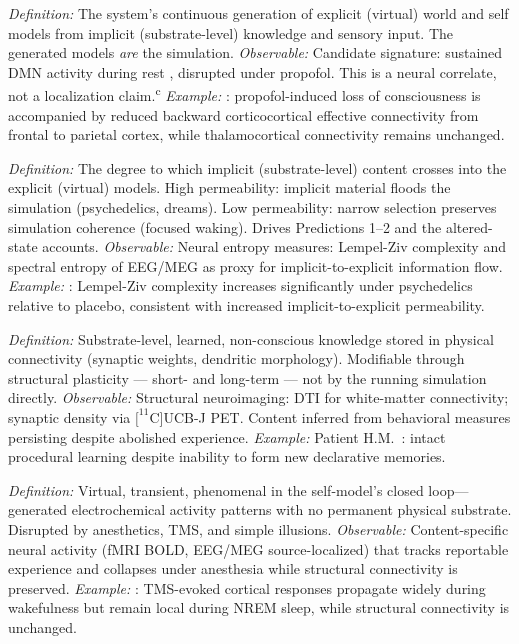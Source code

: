 \documentclass[12pt]{article}
\begin{document}
\begin{description}[leftmargin=0pt,labelindent=0pt,itemsep=0.8em]
\item[\textsc{Self-simulation}] \emph{Definition:} The system's continuous generation of explicit (virtual) world and self models from implicit (substrate-level) knowledge and sensory input. The generated models \emph{are} the simulation. \emph{Observable:} Candidate signature: sustained DMN activity during rest \citep{Raichle2001}, disrupted under propofol. This is a neural correlate, not a localization claim.\textsuperscript{c} \emph{Example:} \citet{Boly2012}: propofol-induced loss of consciousness is accompanied by reduced backward corticocortical effective connectivity from frontal to parietal cortex, while thalamocortical connectivity remains unchanged.

\item[\textsc{Permeability}] \emph{Definition:} The degree to which implicit (substrate-level) content crosses into the explicit (virtual) models. High permeability: implicit material floods the simulation (psychedelics, dreams). Low permeability: narrow selection preserves simulation coherence (focused waking). Drives Predictions 1--2 and the altered-state accounts. \emph{Observable:} Neural entropy measures: Lempel-Ziv complexity and spectral entropy of EEG/MEG as proxy for implicit-to-explicit information flow. \emph{Example:} \citet{Schartner2017}: Lempel-Ziv complexity increases significantly under psychedelics relative to placebo, consistent with increased implicit-to-explicit permeability.

\item[\textsc{Implicit model} (IWM/ISM)] \emph{Definition:} Substrate-level, learned, non-conscious knowledge stored in physical connectivity (synaptic weights, dendritic morphology). Modifiable through structural plasticity — short- and long-term — not by the running simulation directly. \emph{Observable:} Structural neuroimaging: DTI for white-matter connectivity; synaptic density via $[^{11}$C]UCB-J PET. Content inferred from behavioral measures persisting despite abolished experience. \emph{Example:} Patient H.M.\ \citep{ScovilleMilner1957,Milner1962}: intact procedural learning despite inability to form new declarative memories.

\item[\textsc{Explicit model} (EWM/ESM)] \emph{Definition:} Virtual, transient, phenomenal in the self-model's closed loop---generated electrochemical activity patterns with no permanent physical substrate. Disrupted by anesthetics, TMS, and simple illusions. \emph{Observable:} Content-specific neural activity (fMRI BOLD, EEG/MEG source-localized) that tracks reportable experience and collapses under anesthesia while structural connectivity is preserved. \emph{Example:} \citet{Massimini2005}: TMS-evoked cortical responses propagate widely during wakefulness but remain local during NREM sleep, while structural connectivity is unchanged.


\end{description}
\end{document}
